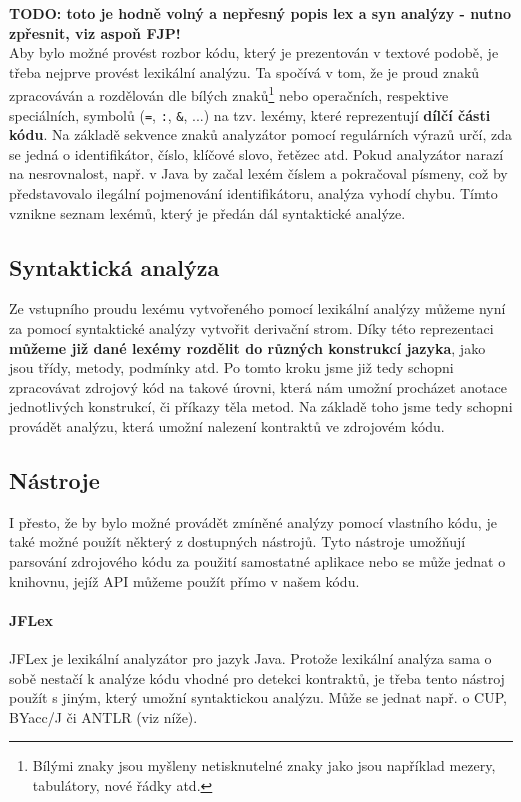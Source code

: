 			\textbf{\textcolor{pblue}{TODO: toto je hodně volný a nepřesný popis lex a syn analýzy - nutno zpřesnit, viz aspoň FJP!}}\\					
		
			Aby bylo možné provést rozbor kódu, který je prezentován v textové podobě, je třeba nejprve provést lexikální analýzu. Ta spočívá v tom, že je proud znaků zpracováván a rozdělován dle bílých znaků\footnote{Bílými znaky jsou myšleny netisknutelné znaky jako jsou například mezery, tabulátory, nové řádky atd.} nebo operačních, respektive speciálních, symbolů (\texttt{=}, \texttt{:}, \texttt{\&}, ...) na tzv. lexémy, které reprezentují \textbf{\textcolor{pblue}{dílčí části kódu}}. Na základě sekvence znaků analyzátor pomocí regulárních výrazů určí, zda se jedná o identifikátor, číslo, klíčové slovo, řetězec atd. Pokud analyzátor narazí na nesrovnalost, např. v Java by začal lexém číslem a pokračoval písmeny, což by představovalo ilegální pojmenování identifikátoru, analýza vyhodí chybu. Tímto vznikne seznam lexémů, který je předán dál syntaktické analýze.
			
		\subsection{Syntaktická analýza}
			Ze vstupního proudu lexému vytvořeného pomocí lexikální analýzy můžeme nyní za pomocí syntaktické analýzy vytvořit derivační strom. Díky této reprezentaci \textbf{\textcolor{pblue}{můžeme již dané lexémy rozdělit do různých konstrukcí jazyka}}, jako jsou třídy, metody, podmínky atd. Po tomto kroku jsme již tedy schopni zpracovávat zdrojový kód na takové úrovni, která nám umožní procházet anotace jednotlivých konstrukcí, či příkazy těla metod. Na základě toho jsme tedy schopni provádět analýzu, která umožní nalezení kontraktů ve zdrojovém kódu. 			
			
		\subsection{Nástroje}
			I přesto, že by bylo možné provádět zmíněné analýzy pomocí vlastního kódu, je také možné použít některý z dostupných nástrojů. Tyto nástroje umožňují parsování zdrojového kódu za použití samostatné aplikace nebo se může jednat o knihovnu, jejíž API můžeme použít přímo v našem kódu.
			
			\paragraph{JFLex}
				JFLex \cite{jflex} je lexikální analyzátor pro jazyk Java. Protože lexikální analýza sama o sobě nestačí k analýze kódu vhodné pro detekci kontraktů, je třeba tento nástroj použít s jiným, který umožní syntaktickou analýzu. Může se jednat např. o CUP, BYacc/J či ANTLR (viz níže). 						
			
